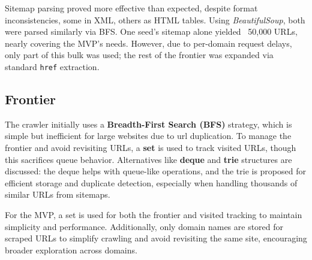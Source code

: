 
Sitemap parsing proved more effective than expected, despite format inconsistencies, some in XML, others as HTML tables. Using \textit{BeautifulSoup}, both were parsed similarly via BFS. One seed's sitemap alone yielded ~50,000 URLs, nearly covering the MVP's needs. However, due to per-domain request delays, only part of this bulk was used; the rest of the frontier was expanded via standard \texttt{href} extraction.

\subsection{Frontier}

The crawler initially uses a \textbf{Breadth-First Search (BFS)} strategy, which is simple but inefficient for large websites due to url duplication. To manage the frontier and avoid revisiting URLs, a \textbf{set} is used to track visited URLs, though this sacrifices queue behavior. Alternatives like \textbf{deque} and \textbf{trie} structures are discussed: the deque helps with queue-like operations, and the trie is proposed for efficient storage and duplicate detection, especially when handling thousands of similar URLs from sitemaps.

For the MVP, a set is used for both the frontier and visited tracking to maintain simplicity and performance. Additionally, only domain names are stored for scraped URLs to simplify crawling and avoid revisiting the same site, encouraging broader exploration across domains.


